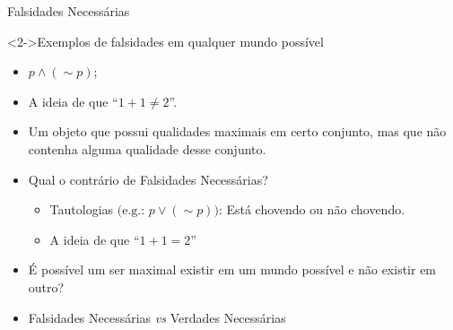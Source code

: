 \begin{frame}{Falsidades Necessárias}
	 \begin{exampleblock}<2->{Exemplos de falsidades em qualquer mundo possível}
   \begin{itemize}
    \item<3-> $ p \wedge (\sim\! p)$;
    \item<4-> A ideia de que ``$ 1 + 1 \neq 2 $''.
    \item<5-> Um objeto que possui qualidades maximais em certo conjunto, mas que não contenha alguma qualidade desse conjunto.
   \end{itemize}
  \end{exampleblock}
  
  \begin{itemize}
   \item<6-> Qual o contrário de Falsidades Necessárias?
    \begin{itemize}
     \item<7-> Tautologias $\big(\text{e.g.: } p \vee (\sim\! p)\big)$: Está chovendo ou não chovendo.
     \item<8-> A ideia de que ``$ 1 + 1 = 2 $''
    \end{itemize}
   \item<9-|alert@9> É possível um ser maximal existir em um mundo possível e não existir em outro?
   \item<10-> Falsidades Necessárias \textit{vs} \textcolor{NordGreen}{Verdades Necessárias}
  \end{itemize}
\end{frame}

